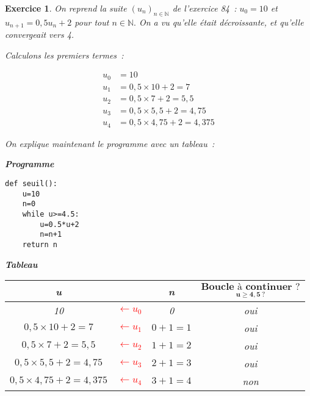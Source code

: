 \documentclass[10pt]{article}
\newtheorem{exo}{Exercice}
\begin{document}
\begin{exo}

On reprend la suite $(u_n)_{n\in\mathbb{N}}$ de l'exercice 84~: $u_0=10$ et $u_{n+1}=0,5u_n+2$ pour tout $n\in\mathbb{N}.$ On a vu qu'elle était décroissante, et qu'elle convergeait vers 4.

\medskip

Calculons les premiers termes~:

\begin{align*}
u_0&=10\\
u_1&=0,5\times 10+2=7\\
u_2&=0,5\times 7+2=5,5\\
u_3&=0,5\times 5,5+2=4,75\\
u_4&=0,5\times 4,75+2=4,375
\end{align*}




On explique maintenant le programme avec un tableau~:

\medskip

\setlength{\columnseprule}{1pt}
\begin{multicols}{2}

\begin{center}
\textbf{Programme}
\end{center}




\begin{lstlisting}
def seuil():
	u=10
	n=0
	while u>=4.5:
		u=0.5*u+2
		n=n+1
	return n
\end{lstlisting}








\columnbreak

\begin{center}
\textbf{Tableau}
\end{center}

\medskip

\begin{center}


\begin{tabular}{|cc|c|c|} \hline
\textbf{u}& &\textbf{n}& $\underset{\mathbf{\text{u}\geq 4,5~?}}{\textbf{Boucle à continuer~?}}$\\ \hline
10&\textcolor{red}{$\leftarrow {u_0}$}& 0&oui\\ \hline
$0,5\times 10+2=7$&\textcolor{red}{$\leftarrow {u_1}$}& $0+1=1$&oui\\ \hline
$0,5\times 7+2=5,5$&\textcolor{red}{$\leftarrow {u_2}$}& $1+1=2$&oui\\ \hline
$0,5\times 5,5+2=4,75$&\textcolor{red}{$\leftarrow {u_3}$}& $2+1=3$&oui\\ \hline
$0,5\times 4,75+2=4,375$&\textcolor{red}{$\leftarrow {u_4}$}& $3+1=4$&non\\ \hline
\end{tabular}
\end{center}


\end{multicols}
\end{exo}
\end{document}
